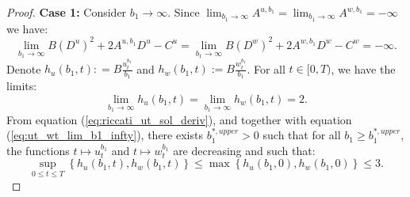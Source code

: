 \documentclass[11pt]{article}
\begin{document}
\begin{proof}
	\textbf{Case 1:} Consider $b_1 \to \infty$. Since $\lim_{b_1 \to \infty} A^{u,b_1} = \lim_{b_1 \to \infty} A^{w,b_1} = - \infty$ we have:
	$$\lim_{b_1 \to \infty}B (D^{u})^2 + 2 A^{u,b_1} D^{u} - C^{u} = \lim_{b_1 \to \infty}B (D^{w})^2 + 2 A^{w,b_1} D^{w} - C^{w}=-\infty.$$
	Denote $h_u(b_1,t): = B \frac{u_t^{b_1}}{b_1}$ and $h_w(b_1,t) := B \frac{w_t^{b_1}}{b_1}$. For all $t \in [0,T)$, we have the limits:
	\begin{equation}
		\lim_{b_1 \to \infty} h_u(b_1,t) =  \lim_{b_1 \to \infty} h_w(b_1,t) = 2.
	\label{eq:ut_wt_lim_b1_infty}
	\end{equation}
	From equation (\ref{eq:riccati_ut_sol_deriv}), and together with equation (\ref{eq:ut_wt_lim_b1_infty}), there exists $b_1^{*,upper} >0$ such that for all $b_1 \geq b_1^{*,upper}$, the functions $t \mapsto u_t^{b_1}$ and $t \mapsto w_t^{b_1}$ are decreasing and such that:
	$$ \sup_{0 \leq t \leq T} \left\{ h_u(b_1, t), h_w(b_1,t)\right\} \leq \max \left\{ h_u(b_1, 0), h_w(b_1,0) \right\} \leq 3.$$
	

\end{proof}
\end{document}
